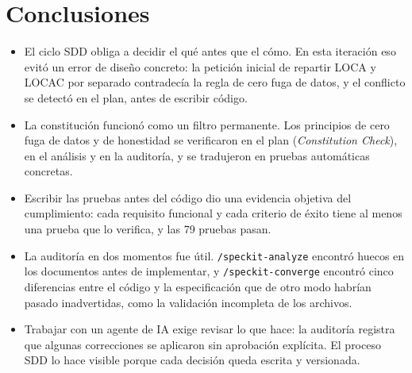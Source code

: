 \documentclass[12pt,a4paper]{article}
\begin{document}
\section{Conclusiones}
\begin{itemize}
  \item El ciclo SDD obliga a decidir el qué antes que el cómo. En esta iteración eso evitó un error de diseño concreto: la petición inicial de repartir LOCA y LOCAC por separado contradecía la regla de cero fuga de datos, y el conflicto se detectó en el plan, antes de escribir código.
  \item La constitución funcionó como un filtro permanente. Los principios de cero fuga de datos y de honestidad se verificaron en el plan (\textit{Constitution Check}), en el análisis y en la auditoría, y se tradujeron en pruebas automáticas concretas.
  \item Escribir las pruebas antes del código dio una evidencia objetiva del cumplimiento: cada requisito funcional y cada criterio de éxito tiene al menos una prueba que lo verifica, y las 79 pruebas pasan.
  \item La auditoría en dos momentos fue útil. \texttt{/speckit-analyze} encontró huecos en los documentos antes de implementar, y \texttt{/speckit-converge} encontró cinco diferencias entre el código y la especificación que de otro modo habrían pasado inadvertidas, como la validación incompleta de los archivos.
  \item Trabajar con un agente de IA exige revisar lo que hace: la auditoría registra que algunas correcciones se aplicaron sin aprobación explícita. El proceso SDD lo hace visible porque cada decisión queda escrita y versionada.
\end{itemize}

\end{document}
